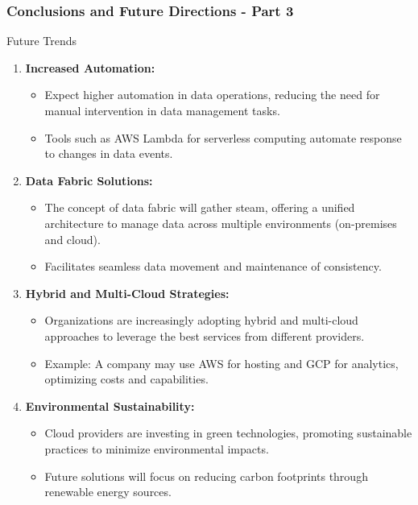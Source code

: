 \documentclass[aspectratio=169]{beamer}
\begin{document}
\begin{frame}[fragile]
    \frametitle{Conclusions and Future Directions - Part 3}
    \begin{block}{Future Trends}
        \begin{enumerate}
            \item \textbf{Increased Automation:}
            \begin{itemize}
                \item Expect higher automation in data operations, reducing the need for manual intervention in data management tasks.
                \item Tools such as AWS Lambda for serverless computing automate response to changes in data events.
            \end{itemize}
            
            \item \textbf{Data Fabric Solutions:}
            \begin{itemize}
                \item The concept of data fabric will gather steam, offering a unified architecture to manage data across multiple environments (on-premises and cloud).
                \item Facilitates seamless data movement and maintenance of consistency.
            \end{itemize}
            
            \item \textbf{Hybrid and Multi-Cloud Strategies:}
            \begin{itemize}
                \item Organizations are increasingly adopting hybrid and multi-cloud approaches to leverage the best services from different providers.
                \item Example: A company may use AWS for hosting and GCP for analytics, optimizing costs and capabilities.
            \end{itemize}
            
            \item \textbf{Environmental Sustainability:}
            \begin{itemize}
                \item Cloud providers are investing in green technologies, promoting sustainable practices to minimize environmental impacts.
                \item Future solutions will focus on reducing carbon footprints through renewable energy sources.
            \end{itemize}
            

\end{enumerate}
\end{block}
\end{frame}
\end{document}
